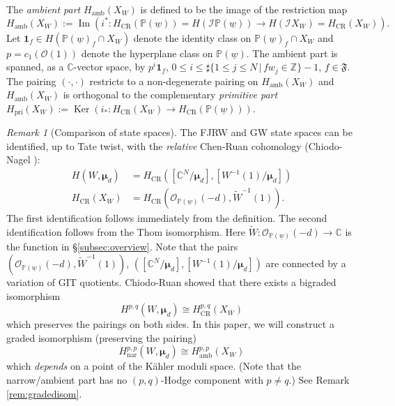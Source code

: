 \documentclass[11pt]{amsart}
\theoremstyle{definition} %
\theoremstyle{remark} %
\newtheorem{rem}[thm]{Remark}%
\newcommand{\CC}{\mathbb C}
\newcommand{\PP}{\mathbb P}
\newcommand{\ZZ}{\mathbb Z}
\newcommand{\nar}{\operatorname{nar}}
\def\CR{\operatorname{\text{CR}}}
\newcommand{\bmu}{\boldsymbol{\mu}}
\newcommand{\tW}{\widetilde{W}}
\newcommand{\cO}{\mathcal{O}}
\newcommand{\cI}{\mathcal{I}}
\newcommand{\frF}{\mathfrak{F}}
\newcommand{\unit}{\boldsymbol{1}}
\newcommand{\amb}{\operatorname{amb}}
\newcommand{\pri}{\operatorname{pri}}
\renewcommand{\CR}{{\operatorname{CR}}}
\newcommand{\Ker}{\operatorname{Ker}}
\newcommand{\Image}{\operatorname{Im}}
\newcommand{\uw}{\underline{w}}
\begin{document}
The \emph{ambient part} $H_{\amb}(X_W)$ is defined to be 
the image of the restriction map 
\[
H_{\amb}(X_W) := \Image \left(
i^* \colon H_{\CR}(\PP(\uw)) = H(\cI\PP(\uw)) 
\to H(\cI X_W) = H_{\CR}(X_W) \right). 
\]
Let $\unit_f\in H(\PP(\uw)_f \cap X_W)$ 
denote the identity class on $\PP(\uw)_f \cap X_W$ 
and $p=c_1(\cO(1))$ denote the hyperplane class on $\PP(\uw)$. 
The ambient part is spanned, as a $\CC$-vector space, 
by $p^i \unit_f$, $0\le i\le  
\sharp\{1\le j\le N\,|\,fw_j\in \ZZ\}-1$, $f\in\frF$. 
The pairing $(\cdot,\cdot)$ restricts to a non-degenerate 
pairing on $H_{\amb}(X_W)$ and $H_{\amb}(X_W)$ is 
orthogonal to the complementary 
\emph{primitive part} 
$H_{\pri}(X_W) := \Ker(i_* \colon H_{\CR}(X_W) \to H_{\CR}(\PP(\uw)))$.

\begin{rem}[Comparison of state spaces] 
The FJRW and GW state spaces 
can be identified, up to Tate twist, with 
the \emph{relative} Chen-Ruan cohomology 
(Chiodo-Nagel \cite{CN:CICY}): 
\begin{align*} 
H(W,\bmu_d) & = H_{\CR}\left(
[\CC^N/\bmu_d], [W^{-1}(1)/\bmu_d]\right) \\ 
H_{\CR}(X_W) & = H_{\CR}(
\cO_{\PP(\uw)}(-d), \tW^{-1}(1)). 
\end{align*} 
The first identification follows immediately from the definition. 
The second identification follows from the Thom isomorphism.  
Here $\tW\colon \cO_{\PP(\uw)}(-d) \to \CC$ is the 
function in \S \ref{subsec:overview}. 
Note that the pairs $(\cO_{\PP(\uw)}(-d), \tW^{-1}(1))$, 
$([\CC^N/\bmu_d], [W^{-1}(1)/\bmu_d])$ are connected
by a variation of GIT quotients. 
Chiodo-Ruan \cite{ChiR} showed that there 
exists a bigraded isomorphism 
\[
H^{p,q}(W,\bmu_d) \cong H^{p,q}_{\CR}(X_W)
\]
which preserves the pairings on both sides. 
In this paper, we will construct a graded isomorphism 
(preserving the pairing) 
\[
H^{p,p}_{\nar}(W,\bmu_d) \cong 
H^{p,p}_{\amb}(X_W) 
\]
which \emph{depends} on a point of the K\"{a}hler moduli space. 
(Note that the narrow/ambient part has no $(p,q)$-Hodge component 
with $p\neq q$.) See Remark \ref{rem:gradedisom}. 
\end{rem} 
\end{document}
